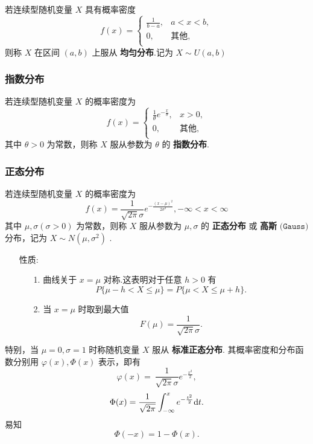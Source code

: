 \documentclass[UTF8,10pt]{ctexart}
\begin{document}
	若连续型随机变量 $ X $ 具有概率密度 $$ f(x)= \begin{cases} \frac{1}{b-a}, & a<x<b,\\ 0, & \mbox{其他},\\ \end{cases} $$ 
	则称 $ X $ 在区间 $ (a,b) $ 上服从 \textbf{均匀分布}.记为 $ X \sim U(a,b) $
	
	\subsubsection{指数分布}
	
	若连续型随机变量 $ X $ 的概率密度为 $$ f(x)= \begin{cases} \frac{1}{ \theta } e^{- \frac{x}{ \theta } }, & x>0,\\ 0, & \mbox{其他},\\ \end{cases} $$ 
	其中 $ \theta >0 $ 为常数，则称 $ X $ 服从参数为 $ \theta $ 的 \textbf{指数分布}.
	
	\subsubsection{正态分布}
	
	若连续型随机变量 $ X $ 的概率密度为 $$ f(x)= \frac{1}{ \sqrt{2 \pi } \sigma } e^{- \frac{(x- \mu )^{2}}{2 \sigma ^{2}} }, - \infty <x< \infty $$ 其中 $ \mu , \sigma ( \sigma >0) $ 为常数，则称 $ X $ 服从参数为 $ \mu , \sigma $ 的 \textbf{正态分布} 或 \textbf{高斯} $ \texttt{(Gauss)} $ 分布，记为 $ X \sim N( \mu , \sigma ^{2}) $ .
	
	\begin{itemize}
		\item [性质:] {
			\begin{enumerate}
				\item [1.] 曲线关于 $ x= \mu $ 对称.这表明对于任意 $ h>0 $ 有 $$ P\{ \mu -h<X \le \mu \}=P\{ \mu < X \le \mu +h\}. $$
				\item [2.] 当 $ x= \mu $ 时取到最大值 $$ F( \mu )= \frac{1}{ \sqrt{2 \pi } \sigma }. $$
			\end{enumerate}
		}
	\end{itemize}

	特别，当 $ \mu =0, \sigma =1 $ 时称随机变量 $ X $ 服从 \textbf{标准正态分布}. 其概率密度和分布函数分别用 $ \varphi(x) , \Phi(x) $ 表示，即有 $$ \varphi(x) =\ \frac{1}{ \sqrt{2 \pi } \sigma } e^{- \frac{x^{2}}{2}}, $$ $$ \Phi(x) = \frac{1}{ \sqrt{2 \pi }} \int_{- \infty }^{x} e^{- \frac{t^{2}}{2}} {\rm d} t. $$
	易知 $$ \Phi(-x) =1- \Phi(x). $$
\end{document}
